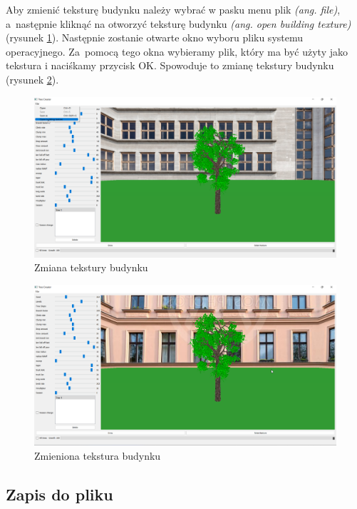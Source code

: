 \documentclass[a4paper,twoside,12pt]{report}
\begin{document}
Aby zmienić teksturę budynku należy wybrać w pasku menu plik 
\textit{(ang. file)}, a~następnie kliknąć na otworzyć 
teksturę budynku \textit{(ang. open building texture)} (rysunek \ref{fig:choosebuild}).
Następnie zostanie otwarte okno wyboru pliku systemu operacyjnego. 
Za~pomocą tego okna wybieramy plik, który ma być użyty 
jako tekstura i naciśkamy przycisk OK. 
Spowoduje to zmianę tekstury budynku (rysunek \ref{fig:choosebuild2}).

\begin{figure}[H]
	\centering\includegraphics[width=15.5cm]{grafika/program/texture4.png}
	\caption{Zmiana tekstury budynku}
    \label{fig:choosebuild}
\end{figure}

\begin{figure}[ht]
	\centering\includegraphics[width=15.5cm]{grafika/program/texture5.png}
	\caption{Zmieniona tekstura budynku}
    \label{fig:choosebuild2}
\end{figure}

\subsection{Zapis do pliku}
\end{document}
